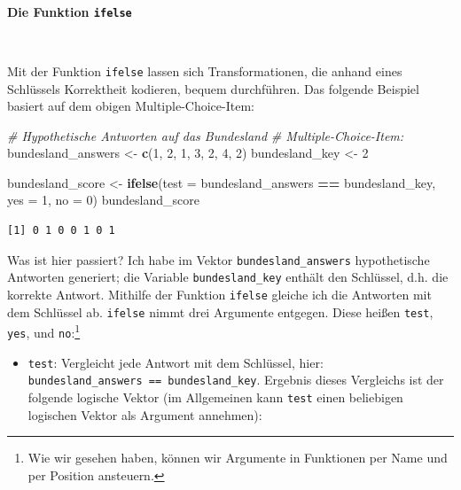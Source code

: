 \documentclass[12pt,]{tufte-book}
\newenvironment{Shaded}{\begin{snugshade}}{\end{snugshade}}
\newcommand{\KeywordTok}[1]{\textcolor[rgb]{0.13,0.29,0.53}{\textbf{#1}}}
\newcommand{\DataTypeTok}[1]{\textcolor[rgb]{0.13,0.29,0.53}{#1}}
\newcommand{\DecValTok}[1]{\textcolor[rgb]{0.00,0.00,0.81}{#1}}
\newcommand{\StringTok}[1]{\textcolor[rgb]{0.31,0.60,0.02}{#1}}
\newcommand{\CommentTok}[1]{\textcolor[rgb]{0.56,0.35,0.01}{\textit{#1}}}
\newcommand{\OperatorTok}[1]{\textcolor[rgb]{0.81,0.36,0.00}{\textbf{#1}}}
\newcommand{\NormalTok}[1]{#1}
\providecommand{\tightlist}{%
  \setlength{\itemsep}{0pt}\setlength{\parskip}{0pt}}
\theoremstyle{definition}
\theoremstyle{definition}
\theoremstyle{definition}
\theoremstyle{remark}
\begin{document}
~

\textbf{Die Funktion \texttt{ifelse}}

~

Mit der Funktion \texttt{ifelse} lassen sich Transformationen, die
anhand eines Schlüssels Korrektheit kodieren, bequem durchführen. Das
folgende Beispiel basiert auf dem obigen Multiple-Choice-Item:

\begin{Shaded}
\begin{Highlighting}[]
\CommentTok{# Hypothetische Antworten auf das Bundesland}
\CommentTok{# Multiple-Choice-Item:}
\NormalTok{bundesland_answers <-}\StringTok{ }\KeywordTok{c}\NormalTok{(}\DecValTok{1}\NormalTok{, }\DecValTok{2}\NormalTok{, }\DecValTok{1}\NormalTok{, }\DecValTok{3}\NormalTok{, }\DecValTok{2}\NormalTok{, }\DecValTok{4}\NormalTok{, }\DecValTok{2}\NormalTok{)}
\NormalTok{bundesland_key <-}\StringTok{ }\DecValTok{2}

\NormalTok{bundesland_score <-}\StringTok{ }\KeywordTok{ifelse}\NormalTok{(}\DataTypeTok{test =}\NormalTok{ bundesland_answers }\OperatorTok{==}\StringTok{ }
\StringTok{    }\NormalTok{bundesland_key, }\DataTypeTok{yes =} \DecValTok{1}\NormalTok{, }\DataTypeTok{no =} \DecValTok{0}\NormalTok{)}
\NormalTok{bundesland_score}
\end{Highlighting}
\end{Shaded}

\begin{verbatim}
[1] 0 1 0 0 1 0 1
\end{verbatim}

Was ist hier passiert? Ich habe im Vektor \texttt{bundesland\_answers}
hypothetische Antworten generiert; die Variable \texttt{bundesland\_key}
enthält den Schlüssel, d.h. die korrekte Antwort. Mithilfe der Funktion
\texttt{ifelse} gleiche ich die Antworten mit dem Schlüssel ab.
\texttt{ifelse} nimmt drei Argumente entgegen. Diese heißen
\texttt{test}, \texttt{yes}, und \texttt{no}:\footnote{Wie wir gesehen
  haben, können wir Argumente in Funktionen per Name und per Position
  ansteuern.}

\begin{itemize}
\tightlist
\item
  \texttt{test}: Vergleicht jede Antwort mit dem Schlüssel, hier:
  \texttt{bundesland\_answers\ ==\ bundesland\_key}. Ergebnis dieses
  Vergleichs ist der folgende logische Vektor (im Allgemeinen kann
  \texttt{test} einen beliebigen logischen Vektor als Argument
  annehmen):
\end{itemize}
\end{document}
